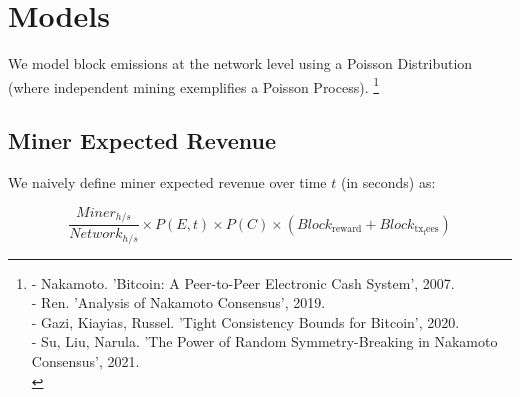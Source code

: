 \documentclass[11pt]{article}
\theoremstyle{plain}
\begin{document}
{%



\pagebreak
\section{\normalsize{Models}}\label{sec: models}

We model block emissions at the network level using a Poisson Distribution
(where independent mining exemplifies a Poisson Process).\nolinebreak
\footnote{
- Nakamoto. 'Bitcoin: A Peer-to-Peer Electronic Cash System', 2007.\\
- Ren. 'Analysis of Nakamoto Consensus', 2019.\\
- Gazi, Kiayias, Russel. 'Tight Consistency Bounds for Bitcoin', 2020.\\
- Su, Liu, Narula. 'The Power of Random Symmetry-Breaking in Nakamoto Consensus', 2021.\\
}

\subsection{\normalsize{Miner Expected Revenue}}

We naively define miner expected revenue over time $t$ (in seconds) as:

\newcommand{\minerHashrate}{Miner_{h/s}}
\newcommand{\networkHashrate}{Network_{h/s}}
\newcommand{\blockReward}{Block_\mathrm{reward}}
\newcommand{\blockTransactionFees}{Block_\mathrm{tx_fees}}

\begin{equation}
\frac{\minerHashrate}{\networkHashrate}
\times
P(E,t)
\times
P(C)
\times
(\blockReward + \blockTransactionFees)
\end{equation}

}
\end{document}
